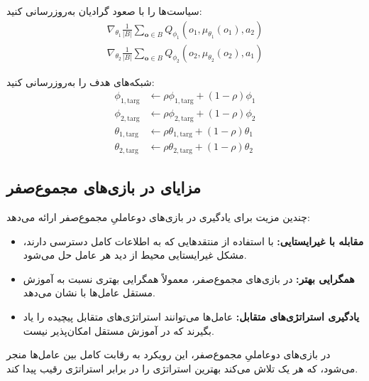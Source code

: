 \begin{algorithm}[H]
\begin{algorithmic}[1]
                    \State \parbox[t]{\dimexpr\linewidth-\algorithmicindent}{
                    سیاست‌ها را با صعود گرادیان به‌روزرسانی کنید:
                    \begin{align*}
                        \nabla_{\theta_1} \frac{1}{|B|}\sum_{\boldsymbol{o} \in B}Q_{\phi_1}(o_1, \mu_{\theta_1}(o_1), a_2) \\
                        \nabla_{\theta_2} \frac{1}{|B|}\sum_{\boldsymbol{o} \in B}Q_{\phi_2}(o_2, \mu_{\theta_2}(o_2), a_1)
                    \end{align*}
                    \strut}
                    
                    \State \parbox[t]{\dimexpr\linewidth-\algorithmicindent}{
                    شبکه‌های هدف را به‌روزرسانی کنید:
                    \begin{align*}
                        \phi_{1,\text{targ}} &\leftarrow \rho \phi_{1,\text{targ}} + (1-\rho) \phi_1 \\
                        \phi_{2,\text{targ}} &\leftarrow \rho \phi_{2,\text{targ}} + (1-\rho) \phi_2 \\
                        \theta_{1,\text{targ}} &\leftarrow \rho \theta_{1,\text{targ}} + (1-\rho) \theta_1 \\
                        \theta_{2,\text{targ}} &\leftarrow \rho \theta_{2,\text{targ}} + (1-\rho) \theta_2
                    \end{align*}
                    \strut}
                \EndFor
            \EndIf
        \EndWhile
    \end{algorithmic}
\end{algorithm}

\subsection{مزایای  در بازی‌های مجموع­‌صفر}

 چندین مزیت برای یادگیری در بازی‌های دو­عاملیِ مجموع­‌صفر ارائه می‌دهد:

\begin{itemize}
    \item \textbf{مقابله با غیرایستایی:} با استفاده از منتقدهایی که به اطلاعات کامل دسترسی دارند، مشکل غیرایستایی محیط از دید هر عامل حل می‌شود.
    \item \textbf{همگرایی بهتر:} در بازی‌های مجموع­‌صفر،  معمولاً همگرایی بهتری نسبت به آموزش مستقل عامل‌ها با  نشان می‌دهد.
    \item \textbf{یادگیری استراتژی‌های متقابل:} عامل‌ها می‌توانند استراتژی‌های متقابل پیچیده را یاد بگیرند که در آموزش مستقل امکان‌پذیر نیست.
\end{itemize}

در بازی‌های دو­عاملیِ مجموع­‌صفر، این رویکرد به رقابت کامل بین عامل‌ها منجر می‌شود، که هر یک تلاش می‌کند بهترین استراتژی را در برابر استراتژی رقیب پیدا کند.